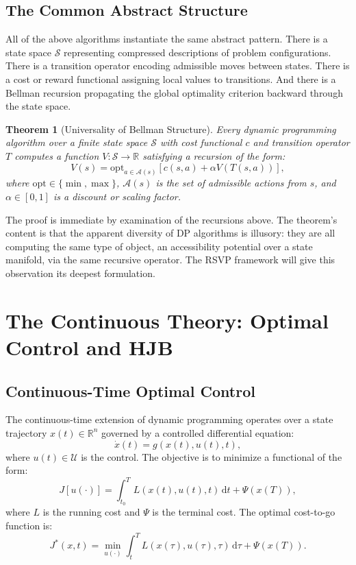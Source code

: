 \documentclass[12pt, a4paper, openany]{book}
\theoremstyle{plain}
\newtheorem{theorem}{Theorem}[chapter]
\theoremstyle{definition}
\theoremstyle{remark}
\begin{document}
\section{The Common Abstract Structure}

All of the above algorithms instantiate the same abstract pattern. There is a state space $\mathcal{S}$ representing compressed descriptions of problem configurations. There is a transition operator encoding admissible moves between states. There is a cost or reward functional assigning local values to transitions. And there is a Bellman recursion propagating the global optimality criterion backward through the state space.

\begin{theorem}[Universality of Bellman Structure]
Every dynamic programming algorithm over a finite state space $\mathcal{S}$ with cost functional $c$ and transition operator $T$ computes a function $V: \mathcal{S} \to \mathbb{R}$ satisfying a recursion of the form:
\[
V(s) = \mathrm{opt}_{a \in \mathcal{A}(s)}\left[c(s,a) + \alpha V(T(s,a))\right],
\]
where $\mathrm{opt} \in \{\min, \max\}$, $\mathcal{A}(s)$ is the set of admissible actions from $s$, and $\alpha \in [0,1]$ is a discount or scaling factor.
\end{theorem}

The proof is immediate by examination of the recursions above. The theorem's content is that the apparent diversity of DP algorithms is illusory: they are all computing the same type of object, an accessibility potential over a state manifold, via the same recursive operator. The RSVP framework will give this observation its deepest formulation.

\chapter{The Continuous Theory: Optimal Control and HJB}

\section{Continuous-Time Optimal Control}

The continuous-time extension of dynamic programming operates over a state trajectory $x(t) \in \mathbb{R}^n$ governed by a controlled differential equation:
\[
\dot{x}(t) = g(x(t), u(t), t),
\]
where $u(t) \in \mathcal{U}$ is the control. The objective is to minimize a functional of the form:
\[
J[u(\cdot)] = \int_{t_0}^{T} L(x(t), u(t), t)\,\mathrm{d}t + \Psi(x(T)),
\]
where $L$ is the running cost and $\Psi$ is the terminal cost. The optimal cost-to-go function is:
\[
J^*(x,t) = \min_{u(\cdot)} \int_t^T L(x(\tau), u(\tau), \tau)\,\mathrm{d}\tau + \Psi(x(T)).
\]
\end{document}
